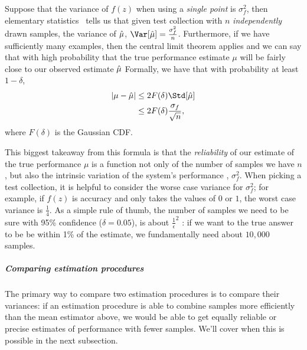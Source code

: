 Suppose that the variance of $f(z)$ when using a \textit{single point} is $\sigma^2_f$, then
elementary statistics~\citep{casella1990statistical} tells us that given test collection with $n$ \textit{independently} drawn samples, the variance of $\hat{\mu}$, $\Var[\muh] = \frac{\sigma^2_f}{n}$.
Furthermore, if we have sufficiently many examples, then the central limit theorem applies and we can say that with high probability that the true performance estimate $\mu$ will be fairly close to our observed estimate $\hat{\mu}$
Formally, we have that with probability at least $1 - \delta$,
\begin{align*}
  |\mu - \muh| &\le 2F(\delta) \Std[\muh] \\
  &\le 2F(\delta) \frac{\sigma_f}{\sqrt{n}},
\end{align*}
where $F(\delta)$ is the Gaussian CDF.\@
{}

This biggest takeaway from this formula is that the \textit{reliability} of our estimate of the true performance $\mu$ is a function not only of the number of samples we have $n$, but also the intrinsic variation of the system's performance , $\sigma^2_f$.
When picking a test collection, it is helpful to consider the worse case variance for $\sigma^2_f$; for example, if $f(z)$ is accuracy and only takes the values of $0$ or $1$, the worst case variance is $\frac{1}{4}$.
As a simple rule of thumb, the number of samples we need to be sure with 95\% confidence ($\delta = 0.05$), is about $\frac{1}{\epsilon}^2$ : if we want to the true answer to be be within 1\% of the estimate, we fundamentally need about $10,000$ samples.

\subparagraph{Comparing estimation procedures}
The primary way to compare two estimation procedures  is to compare their variances: if an estimation procedure is able to combine samples more efficiently than the mean estimator above, we would be able to get equally reliable or precise estimates of performance with fewer samples.
We'll cover when this is possible in the next subsection.

